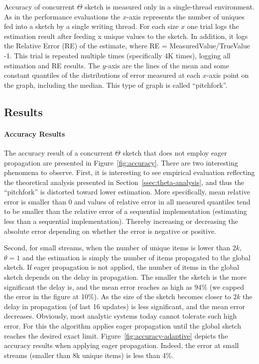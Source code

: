 Accuracy of concurrent $\Theta$ sketch is measured only in a single-thread environment. As in the performance evaluations the $x$-axis represents the number of uniques fed into a sketch by a single writing thread. For each size $x$ one trial logs the estimation result after feeding x unique values to the sketch. In addition, it logs the Relative Error (RE) of the estimate, where RE = MeasuredValue/TrueValue -1. This trial is repeated multiple times (specifically 4K times), logging all estimation and RE results. The $y$-axis are the lines of the mean and some constant quantiles of the distributions of error measured at each $x$-axis point on the graph, including the median. 
This type of graph is called ``pitchfork''. 

\subsection{Results}
\label{ssec:res}

\paragraph{Accuracy Results}
The accuracy result of a concurrent $\Theta$ sketch that does not employ eager propagation are presented in Figure~\ref{fig:accuracy}. There are two interesting phenomena to observe. First, it is interesting to see empirical evaluation reflecting the theoretical analysis presented in Section~\ref{ssec:theta-analysis}, and thus the ``pitchfork'' is distorted toward lower estimation. More specifically, mean relative error is smaller than $0$ and values of relative error in all measured quantiles tend to be smaller than the relative error of a sequential implementation (estimating less than a sequential implementation). Thereby increasing or decreasing the absolute error depending on whether the error is negative or positive.

Second, for small streams, when the number of unique items is lower than $2k$, $\theta=1$ and the estimation is simply the number of items propagated to the global sketch. If eager propagation is not applied, the number of items in the global sketch depends on the delay in propagation. The smaller the sketch is the more significant the delay is, and the mean error reaches as high as 94\% (we capped the error in the figure at 10\%). As the size of the sketch becomes closer to $2k$ the delay in propagation (of last 16 updates) is less significant, and the mean error decreases.
Obviously, most analytic systems today cannot tolerate such high error. For this the algorithm applies eager propagation until the global sketch reaches the desired exact limit. 
Figure~\ref{fig:accuracy-adaptive} depicts the accuracy results when applying eager propagation. Indeed, the error at small streams (smaller than 8k unique items) is less than 4\%.

